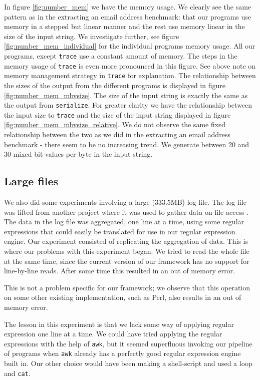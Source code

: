 In figure \vref{fig:number_mem} we have the memory usage. We clearly see the same pattern as in the extracting an
email address benchmark: that our programs use memory in a stepped but linear
manner and the rest use memory linear in the size of the input
string. We investigate further, see figure
\vref{fig:number_mem_individual} for the individual programs memory
usage. All our programs, except \texttt{trace} use a constant amount
of memory. The steps in the memory usage of \texttt{trace} is even
more pronounced in this figure. See above note on memory management
strategy in \texttt{trace} for explanation. The relationship between
the sizes of the output from the different programs is displayed in
figure \vref{fig:number_mem_mbvsize}. The size of the input string is
exactly the same as the output from \texttt{serialize}. For greater
clarity we have the relationship between the input size to
\texttt{trace} and the size of the input string displayed in figure
\vref{fig:number_mem_mbvsize_relative}. We do not observe the same
fixed relationship between the two as we did in the extracting an
email address benchmark - there seem to be no increasing trend. We
generate between 20 and 30 mixed bit-values per byte in the input
string.


\subsection{Large files}

We also did some experiments involving a large (333.5MB) log file. The
log file was lifted from another project where it was used to gather
data on file access \cite{jan2010}. The data in the log file was
aggregated, one line at a time, using some regular expressions that
could easily be translated for use in our regular expression
engine. Our experiment consisted of replicating the aggregation of
data. This is where our problems with this experiment began: We tried
to read the whole file at the same time, since the current version of our framework has no support for line-by-line reads. 
After some time this resulted in an out of memory error. 

This is not a problem specific for our framework; we observe that this operation on some
other existing implementation, such as Perl, also results in an out of
memory error. 

The lesson in this experiment is that we lack some way of applying
regular expression one line at a time. We could have tried applying
the regular expressions with the help of \texttt{awk}, but it seemed
superfluous invoking our pipeline of programs when \texttt{awk}
already has a perfectly good regular expression engine built in. Our
other choice would have been making a shell-script and used a loop and
\texttt{cat}. 


